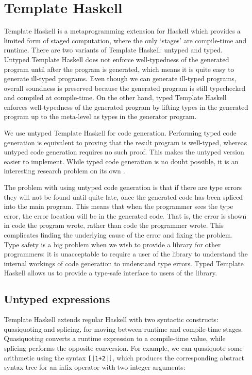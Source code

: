 \section{Template Haskell}
Template Haskell is a metaprogramming extension for Haskell \cite{sheard2002template} which provides a limited form of staged computation, where the only `stages' are compile-time and runtime.
There are two variants of Template Haskell: untyped and typed.
Untyped Template Haskell does not enforce well-typedness of the generated program until after the program is generated, which means it is quite easy to generate ill-typed programs.
Even though we can generate ill-typed programs, overall soundness is preserved because the generated program is still typechecked and compiled at compile-time.
On the other hand, typed Template Haskell enforces well-typedness of the generated program by lifting types in the generated program up to the meta-level as types in the generator program.

We use untyped Template Haskell for code generation.
Performing typed code generation is equivalent to proving that the result program is well-typed, whereas untyped code generation requires no such proof.
This makes the untyped version easier to implement.
While typed code generation is no doubt possible, it is an interesting research problem on its own .

The problem with using untyped code generation is that if there are type errors they will not be found until quite late, once the generated code has been spliced into the main program.
This means that when the programmer sees the type error, the error location will be in the generated code.
That is, the error is shown in code the program wrote, rather than code the programmer wrote.
This complicates finding the underlying cause of the error and fixing the problem.
Type safety is a big problem when we wish to provide a library for other programmers: it is unacceptable to require a user of the library to understand the internal workings of code generation to understand type errors.
Typed Template Haskell allows us to provide a type-safe interface to users of the library.

\subsection{Untyped expressions}

Template Haskell extends regular Haskell with two syntactic constructs: quasiquoting and splicing, for moving between runtime and compile-time stages.
Quasiquoting converts a runtime expression to a compile-time value, while splicing performs the opposite conversion.
For example, we can quasiquote some arithmetic using the syntax \lstinline/[|1+2|]/, which produces the corresponding abstract syntax tree for an infix operator with two integer arguments:

